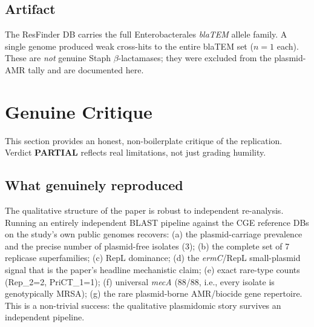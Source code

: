 \documentclass[11pt]{article}
\begin{document}
\subsection{Artifact}
The ResFinder DB carries the full Enterobacterales \emph{blaTEM} allele
family. A single genome produced weak cross-hits to the entire blaTEM set
($n{=}1$ each). These are \emph{not} genuine Staph $\beta$-lactamases; they
were excluded from the plasmid-AMR tally and are documented here.

\section{Genuine Critique}

This section provides an honest, non-boilerplate critique of the
replication. Verdict \textbf{PARTIAL} reflects real limitations, not just
grading humility.

\subsection{What genuinely reproduced}
The qualitative structure of the paper is robust to independent re-analysis.
Running an entirely independent BLAST pipeline against the CGE reference
DBs on the study's own public genomes recovers: (a) the plasmid-carriage
prevalence and the precise number of plasmid-free isolates (3); (b) the
complete set of 7 replicase superfamilies; (c) RepL dominance; (d) the
\emph{ermC}/RepL small-plasmid signal that is the paper's headline
mechanistic claim; (e) exact rare-type counts (Rep\_2=2, PriCT\_1=1);
(f) universal \emph{mecA} (88/88, i.e., every isolate is genotypically
MRSA); (g) the rare plasmid-borne AMR/biocide gene repertoire. This is a
non-trivial success: the qualitative plasmidomic story survives an
independent pipeline.
\end{document}
